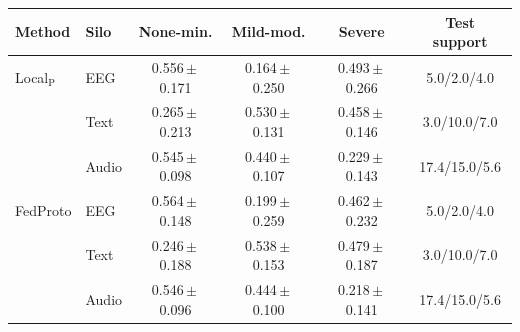 \begin{tabular}{llcccc}
\toprule
\textbf{Method} & \textbf{Silo} & \textbf{None-min.} & \textbf{Mild-mod.} & \textbf{Severe} & \textbf{Test support} \\
\midrule
Local$_{\mathrm{P}}$ & EEG & 0.556\,$\pm$\,0.171 & 0.164\,$\pm$\,0.250 & 0.493\,$\pm$\,0.266 & 5.0/2.0/4.0 \\
 & Text & 0.265\,$\pm$\,0.213 & 0.530\,$\pm$\,0.131 & 0.458\,$\pm$\,0.146 & 3.0/10.0/7.0 \\
 & Audio & 0.545\,$\pm$\,0.098 & 0.440\,$\pm$\,0.107 & 0.229\,$\pm$\,0.143 & 17.4/15.0/5.6 \\
\midrule
FedProto & EEG & 0.564\,$\pm$\,0.148 & 0.199\,$\pm$\,0.259 & 0.462\,$\pm$\,0.232 & 5.0/2.0/4.0 \\
 & Text & 0.246\,$\pm$\,0.188 & 0.538\,$\pm$\,0.153 & 0.479\,$\pm$\,0.187 & 3.0/10.0/7.0 \\
 & Audio & 0.546\,$\pm$\,0.096 & 0.444\,$\pm$\,0.100 & 0.218\,$\pm$\,0.141 & 17.4/15.0/5.6 \\
\bottomrule
\end{tabular}